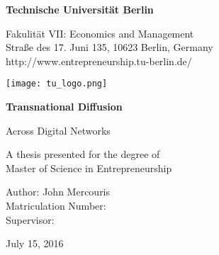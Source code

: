 \begin{titlepage}
    \begin{center}
        \vspace*{1cm}

        \Huge
        \textbf{Technische Universit{\"a}t Berlin}

        \vspace{0.50cm}

        \Large
        Fakulit{\"a}t VII: Economics and Management\\
        Stra{\ss}e des 17. Juni 135, 10623 Berlin, Germany\\
        http://www.entrepreneurship.tu-berlin.de/\\

        \vspace{1.25cm}

        \texttt{[image: tu\_logo.png]}

        \vspace{1.25cm}
        
        \Huge
        \textbf{Transnational Diffusion}
        
        \vspace{0.25cm}
        \LARGE
        Across Digital Networks
        
        \vspace{1.0cm}
        
        A thesis presented for the degree of\\
        Master of Science in Entrepreneurship
        
        \vspace{1.5cm}
                
        \Large
        Author: John Mercouris\\
        Matriculation Number: \\
        Supervisor: \\

        \vspace{1.0cm}
        
        July 15, 2016
        
    \end{center}
\end{titlepage}
